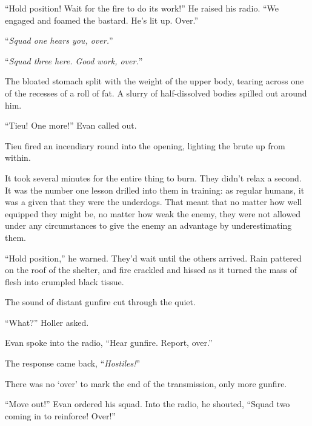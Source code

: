 ``Hold position!  Wait for the fire to do its work!''  He raised his radio.  ``We engaged and foamed the bastard.  He's lit up.  Over.''



``\emph{Squad one hears you, over.}''



``\emph{Squad three here.  Good work, over.}''



The bloated stomach split with the weight of the upper body, tearing across one of the recesses of a roll of fat.  A slurry of half-dissolved bodies spilled out around him.



``Tieu!  One more!''  Evan called out.



Tieu fired an incendiary round into the opening, lighting the brute up from within.



It took several minutes for the entire thing to burn.  They didn't relax a second.  It was the number one lesson drilled into them in training: as regular humans, it was a given that they were the underdogs.  That meant that no matter how well equipped they might be, no matter how weak the enemy, they were not allowed under any circumstances to give the enemy an advantage by underestimating them.



``Hold position,'' he warned.  They'd wait until the others arrived.  Rain pattered on the roof of the shelter, and fire crackled and hissed as it turned the mass of flesh into crumpled black tissue.



The sound of distant gunfire cut through the quiet.



``What?'' Holler asked.



Evan spoke into the radio, ``Hear gunfire.  Report, over.''



The response came back, ``\emph{Hostiles!}''



There was no `over' to mark the end of the transmission, only more gunfire.



``Move out!''  Evan ordered his squad.  Into the radio, he shouted, ``Squad two coming in to reinforce!  Over!''



